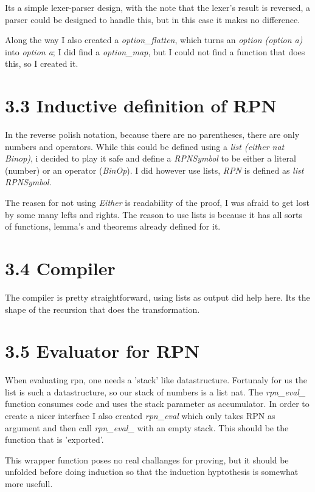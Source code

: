 \documentclass[10pt,a4paper,usenames,dvipnames]{article}
\begin{document}
Its a simple lexer-parser design, with the note that the lexer's result is reversed, a parser could be designed to handle this, but in this case it makes no difference.

Along the way I also created a \emph{option\_flatten}, which turns an \emph{option (option a)} into \emph{option a}; I did find a \emph{option\_map}, but I could not find a function that does this, so I created it.

\section*{3.3 Inductive definition of RPN }

In the reverse polish notation, because there are no parentheses, there are only numbers and operators. While this could be defined using a \emph{list (either nat Binop)}, i decided to play it safe and define a \emph{RPNSymbol} to be either a literal (number) or an operator (\emph{BinOp}). I did however use lists, \emph{RPN} is defined as \emph{list RPNSymbol}.

The reasen for not using \emph{Either} is readability of the proof, I was afraid to get lost by some many lefts and rights. The reason to use lists is because it has all sorts of functions, lemma's and theorems already defined for it.

\section*{3.4 Compiler }
The compiler is pretty straightforward, using lists as output did help here. Its the shape of the recursion that does the transformation.

\section*{3.5 Evaluator for RPN}
When evaluating rpn, one needs a 'stack' like datastructure. Fortunaly for us the list is such a datastructure, so our stack of numbers is a list nat. The \emph{rpn\_eval\_} function consumes code and uses the stack parameter as accumulator. In order to create a nicer interface I also created \emph{rpn\_eval} which only takes RPN as argument and then call \emph{rpn\_eval\_} with an empty stack. This should be the function that is 'exported'.

This wrapper function poses no real challanges for proving, but it should be unfolded before doing induction so that the induction hyptothesis is somewhat more usefull.
\end{document}
